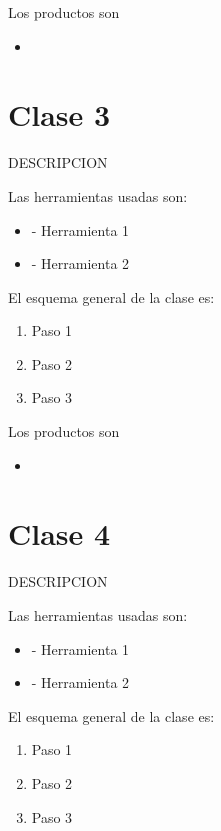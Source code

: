 \documentclass[12pt]{report}
\begin{document}
Los productos son 

\begin{itemize}
    \item {}
\end{itemize}

\section{Clase 3}
DESCRIPCION

Las herramientas usadas son:

\begin{itemize}
    \item {} - Herramienta 1
    \item {} - Herramienta 2
\end{itemize}

El esquema general de la clase es:

\begin{enumerate}
    \item Paso 1
    \item Paso 2
    \item Paso 3
\end{enumerate}

Los productos son 

\begin{itemize}
    \item {}
\end{itemize}

\section{Clase 4}
DESCRIPCION

Las herramientas usadas son:

\begin{itemize}
    \item {} - Herramienta 1
    \item {} - Herramienta 2
\end{itemize}

El esquema general de la clase es:

\begin{enumerate}
    \item Paso 1
    \item Paso 2
    \item Paso 3
\end{enumerate}
\end{document}

